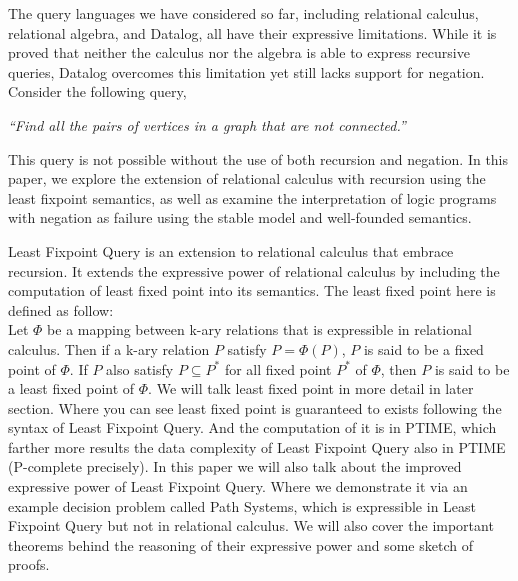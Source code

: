 The query languages we have considered so far, including relational calculus, 
relational algebra, and Datalog, all have their expressive limitations. While 
it is proved that neither the calculus nor the algebra is able to express 
recursive queries, Datalog overcomes this limitation yet still lacks support 
for negation. Consider the following query,
\begin{displayquote}
    \textit{``Find all the pairs of vertices in a 
    graph that are not connected.''}
\end{displayquote}
This query is not possible without the use of both recursion and negation. 
In this paper, we explore the extension of relational calculus with 
recursion using the least fixpoint semantics, as well as examine the interpretation  
of logic programs with negation as failure using the stable model 
and well-founded semantics.

Least Fixpoint Query is an extension to relational calculus that embrace recursion. It extends the expressive power of relational calculus by including the computation of least fixed point into its semantics. The least fixed point here is defined as follow: \\
Let $\Phi$ be a mapping between k-ary relations that is expressible in relational calculus. Then if a k-ary relation $P$ satisfy $P= \Phi(P)$, $P$ is said to be a fixed point of $\Phi$. If $P$ also satisfy $P \subseteq P^*$ for all fixed point $P^*$ of $\Phi$, then $P$ is said to be a least fixed point of $\Phi$.
We will talk least fixed point in more detail in later section. Where you can see least fixed point is guaranteed to exists following the syntax of Least Fixpoint Query. And the computation of it is in PTIME, which farther more results the data complexity of Least Fixpoint Query also in PTIME (P-complete precisely). 
In this paper we will also talk about the improved expressive power of Least Fixpoint Query. Where we demonstrate it via an example decision problem called Path Systems, which is expressible in Least Fixpoint Query but not in relational calculus. We will also cover the important theorems behind the reasoning of their expressive power and some sketch of proofs.


